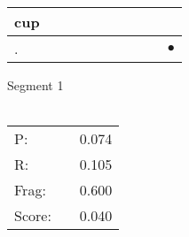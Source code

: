 \documentclass[landscape]{article}
\newcommand{\ssp}{\hspace{2pt}}
\newcommand{\mex}{\cellcolor{g}$\bullet$}
\begin{document}
\begin{tabular}{|l|p{10pt}|p{10pt}|p{10pt}|p{10pt}|p{10pt}|p{10pt}|p{10pt}|p{10pt}|p{10pt}|}
\hline
\ssp cup \ssp&\hspace{2pt}&\hspace{2pt}&\hspace{2pt}&\hspace{2pt}&\hspace{2pt}&\hspace{2pt}&\hspace{2pt}&\hspace{2pt}&\hspace{2pt}\\
\hline
\ssp \cellcolor{ref8}. \ssp&\hspace{2pt}&\hspace{2pt}&\hspace{2pt}&\hspace{2pt}&\hspace{2pt}&\hspace{2pt}&\hspace{2pt}&\hspace{2pt}&\hspace{2pt}\mex\\
\hline
\end{tabular}

\vspace{6pt}
\noindent Segment 1\\\\
\noindent\begin{tabular}{lm{12pt}r}
\hline
P:&&0.074\\
R:&&0.105\\
Frag:&&0.600\\
Score:&&0.040\\
\end{tabular}

\newpage
\end{document}
